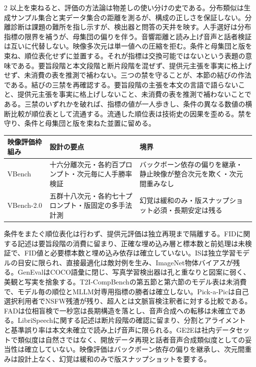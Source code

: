 \documentclass[lualatex,a4paper,10pt]{jlreq}
\begin{document}
\begin{multicols}{2}
以上を束ねると、評価の方法論は物差しの使い分けの史である。分布類似は生成サンプル集合と実データ集合の距離を測るが、構成の正しさを保証しない\autocite{btd083,btd084}。分離診断は課題の難所を指し示すが、検出器と問答の天井を映す\autocite{btd085,btd086}。人手選好は分布指標の限界を補うが、母集団の偏りを伴う\autocite{btd087}。音響距離と読み上げ音声と話者検証は互いに代替しない\autocite{btd088,btd089,btd090}。映像多次元は単一値への圧縮を拒む\autocite{btd092,btd093}。条件と母集団と版を束ね、順位表化せずに並置する。それが指標は交換可能ではないという表題の意味である。要旨段階と本文段階と断片段階を混ぜず、提供元主張を事実に格上げせず、未消費の表を推測で補わない。三つの禁を守ることが、本節の結びの作法である。結びの三禁を再確認する。要旨段階の主張を本文の言語で語らないこと、提供元主張を事実に格上げしないこと、未消費の表を推測で補わないことである。三禁のいずれかを破れば、指標の値が一人歩きし、条件の異なる数値の横断比較が順位表として流通する。流通した順位表は技術史の因果を歪める。禁を守り、条件と母集団と版を束ねた並置に留める\autocite{btd083,btd085,btd086,btd089}。
\end{multicols}

\begin{center}
\small
\begin{tabularx}{\textwidth}{@{}p{}p{}X@{}}
\toprule
映像評価枠組み & 設計の要点 & 境界 \\
\midrule
VBench & 十六分離次元・各約百プロンプト・次元毎に人手勝率検証 & バックボーン依存の偏りを継承・静止映像が整合次元を欺く・次元間重みなし \\
VBench-2.0 & 五群十八次元・各約七十プロンプト・版固定の多手法計測 & 幻覚は緩和のみ・版スナップショット必須・長期安定は残る \\
\bottomrule
\end{tabularx}
\end{center}
\autocite{btd092,btd093}

\begin{claimboundary}[本節の読解上の境界]
条件をまたぐ順位表化は行わず、提供元評価は独立再現まで隔離する。FIDに関する記述は要旨段階の消費に留まり、正確な埋め込み層と標本数と前処理は未検証で、FID値と必要標本数と埋め込み依存は確立していない。ISは独立学習モデルの目安に限られ、直接最適化は敵対例を生み、ImageNet物体バイアスが残る。GenEvalはCOCO語彙に閉じ、写真学習検出器は孔と重なりと図案に弱く、美観と写実を捨象する。T2I-CompBenchの第五節と第六節のモデル表は未消費で、モデル毎の順位とMLLM対専用指標の勝者は確立しない。Pick-a-Picは自己選択利用者でNSFW残渣が残り、超人とは文脈盲検注釈者に対する比較である。FADは位相盲検で一秒窓は長期構造を落とし、音声合成への転移は未確立である。LibriSpeechに関する記述は断片段階の確認に留まり、分割とアライメントと基準誤り率は本文未確立で読み上げ音声に限られる。GE2Eは社内データセットで類似度は自然さではなく、開放データ再現と話者音声合成類似度としての妥当性は確立していない。映像評価はバックボーン依存の偏りを継承し、次元間重みは設計上なく、幻覚は緩和のみで版スナップショットを要する。
\end{claimboundary}
\end{document}
